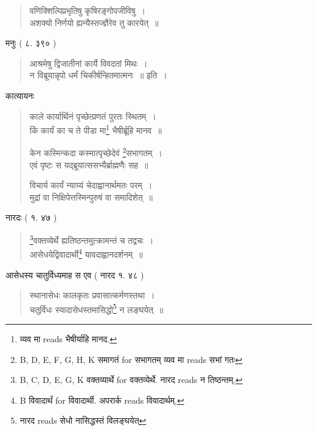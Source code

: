 \documentclass[11pt, openany]{book}
\begin{document}
\newpage
{}

\begin{quote}
{\vy वणिक्शिल्पिप्रभृतिषु कृषिरङ्गोपजीविषु~।\\
अशक्यो निर्णयो ह्यन्यैस्तज्ज्ञैरेव तु कारयेत्~॥}
\end{quote}

मनुः ( ८. ३९० )

\begin{quote}
{\vy आश्रमेषु द्विजातीनां कार्ये विवदतां मिथः~।\\
न विब्रूयान्नृपो धर्मं चिकीर्षन्हितमात्मनः~॥} इति~।
\end{quote}

कात्यायनः

\begin{quote}
{\vy काले कार्यार्थिनं पृच्छेत्प्रणतं पुरतः स्थितम्~।\\
किं कार्यं का च ते पीडा मा\renewcommand{\thefootnote}{1}\footnote{व्यव मा reads भैषीर्याहि मानद.} भैषीर्ब्रूहि मानव~॥

केन कस्मिन्कदा कस्मात्पृच्छेदेवं \renewcommand{\thefootnote}{2}\footnote{B, D, E, F, G, H, K समागतं for सभागतम् व्यव मा reads सभां गतः}सभागतम्~।\\
एवं पृष्टः स यद्ब्रूयात्ससभ्यैर्ब्राह्मणैः सह~॥

विचार्य कार्यं न्याय्यं चेदाह्वानार्थमतः परम्~।\\
मुद्रां वा निक्षिपेत्तस्मिन्पुरुषं वा समादिशेत्~॥}
\end{quote}

नारदः ( १. ४७ ) 

\begin{quote}
{\vy \renewcommand{\thefootnote}{3}\footnote{B, C, D, E, G, K वक्तव्यार्थे for वक्तव्येर्थे. नारद reads न तिष्ठन्तम्.}वक्तव्येर्थे ह्यतिष्ठन्तमुत्क्रामन्तं च तद्वचः~।\\
आसेधयेद्विवादार्थी\renewcommand{\thefootnote}{4}\footnote{B विवादार्थं for विवादार्थी. अपरार्क reads विवादार्थम्.} यावदाह्वानदर्शनम्~॥}
\end{quote}

आसेधस्य चातुर्विध्यमाह स एव ( नारद १. ४८ ) 

\begin{quote}
{\vy स्थानासेधः कालकृतः प्रवासात्कर्मणस्तथा~।\\
चतुर्विधः स्यादासेधस्तमासिद्धो\renewcommand{\thefootnote}{5}\footnote{नारद reads {\qt सेधो नासिद्धस्तं विलङ्घयेत्}} न लङ्घयेत्~॥}
\end{quote}
\end{document}
